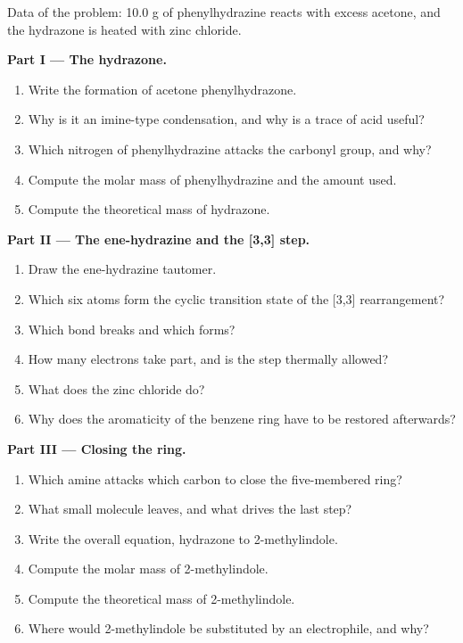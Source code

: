 \begin{problem}
\label{pb:b3:heterocycles:1}
Data of the problem: 10.0 g of phenylhydrazine reacts with excess acetone, and
the hydrazone is heated with zinc chloride.

\medskip\noindent\textbf{Part I --- The hydrazone.}
\begin{enumerate}
  \item Write the formation of acetone phenylhydrazone.
  \item Why is it an imine-type condensation, and why is a trace of acid useful?
  \item Which nitrogen of phenylhydrazine attacks the carbonyl group, and why?
  \item Compute the molar mass of phenylhydrazine and the amount used.
  \item Compute the theoretical mass of hydrazone.
\end{enumerate}

\medskip\noindent\textbf{Part II --- The ene-hydrazine and the [3,3] step.}
\begin{enumerate}[resume]
  \item Draw the ene-hydrazine tautomer.
  \item Which six atoms form the cyclic transition state of the [3,3] rearrangement?
  \item Which bond breaks and which forms?
  \item How many electrons take part, and is the step thermally allowed?
  \item What does the zinc chloride do?
  \item Why does the aromaticity of the benzene ring have to be restored afterwards?
\end{enumerate}

\medskip\noindent\textbf{Part III --- Closing the ring.}
\begin{enumerate}[resume]
  \item Which amine attacks which carbon to close the five-membered ring?
  \item What small molecule leaves, and what drives the last step?
  \item Write the overall equation, hydrazone to 2-methylindole.
  \item Compute the molar mass of 2-methylindole.
  \item Compute the theoretical mass of 2-methylindole.
  \item Where would 2-methylindole be substituted by an electrophile, and why?
\end{enumerate}


\end{problem}
